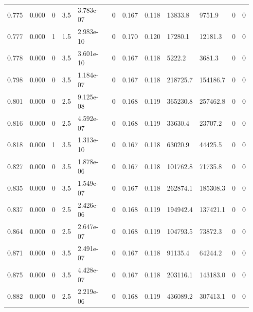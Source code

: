 \documentclass[preview]{standalone}
\begin{document}
{{{\begin{tabular}{L{1.2cm}C{1.2cm} C{0.3cm}C{0.5cm} C{1.4cm}C{1.4cm} C{1.4cm}C{1.4cm} C{1.6cm}C{1.6cm} C{1.6cm}C{1.6cm}}
  0.775  &  0.000  & 0     & 3.5 &  3.783e-07  & 0  &  0.167&   0.118& 13833.8 & 9751.9   &  0 & 0  \\ 
  0.777  &  0.000  & 1     & 1.5 &  2.983e-10  & 0  &  0.170&   0.120& 17280.1 & 12181.3   &  0 & 0  \\ 
  0.778  &  0.000  & 0     & 3.5 &  3.601e-10  & 0  &  0.167&   0.118& 5222.2 & 3681.3   &  0 & 0  \\ 
  0.798  &  0.000  & 0     & 3.5 &  1.184e-07  & 0  &  0.167&   0.118& 218725.7 & 154186.7   &  0 & 0  \\ 
  0.801  &  0.000  & 0     & 2.5 &  9.125e-08  & 0  &  0.168&   0.119& 365230.8 & 257462.8   &  0 & 0  \\ 
  0.816  &  0.000  & 0     & 2.5 &  4.592e-07  & 0  &  0.168&   0.119& 33630.4 & 23707.2   &  0 & 0  \\ 
  0.818  &  0.000  & 1     & 3.5 &  1.313e-10  & 0  &  0.167&   0.118& 63020.9 & 44425.5   &  0 & 0  \\ 
  0.827  &  0.000  & 0     & 3.5 &  1.878e-06  & 0  &  0.167&   0.118& 101762.8 & 71735.8   &  0 & 0  \\ 
  0.835  &  0.000  & 0     & 3.5 &  1.549e-07  & 0  &  0.167&   0.118& 262874.1 & 185308.3   &  0 & 0  \\ 
  0.837  &  0.000  & 0     & 2.5 &  2.426e-06  & 0  &  0.168&   0.119& 194942.4 & 137421.1   &  0 & 0  \\ 
  0.864  &  0.000  & 0     & 2.5 &  2.647e-07  & 0  &  0.168&   0.119& 104793.5 & 73872.3   &  0 & 0  \\ 
  0.871  &  0.000  & 0     & 3.5 &  2.491e-07  & 0  &  0.167&   0.118& 91135.4 & 64244.2   &  0 & 0  \\ 
  0.875  &  0.000  & 0     & 3.5 &  4.428e-07  & 0  &  0.167&   0.118& 203116.1 & 143183.0   &  0 & 0  \\ 
  0.882  &  0.000  & 0     & 2.5 &  2.219e-06  & 0  &  0.168&   0.119& 436089.2 & 307413.1   &  0 & 0  \\ 
\hline 
\end{tabular} 

}}}
\end{document}
